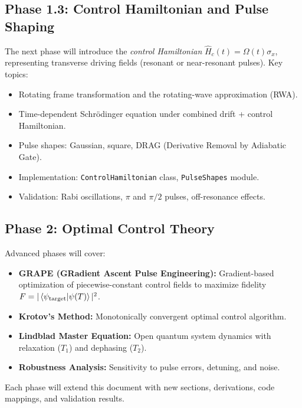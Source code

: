 \documentclass[11pt,a4paper]{article}
\theoremstyle{definition}
\theoremstyle{remark}
\begin{document}
\subsection{Phase 1.3: Control Hamiltonian and Pulse Shaping}

The next phase will introduce the \emph{control Hamiltonian} $\hat{H}_c(t) = \Omega(t) \sigma_x$, representing transverse driving fields (resonant or near-resonant pulses). Key topics:

\begin{itemize}
    \item Rotating frame transformation and the rotating-wave approximation (RWA).
    \item Time-dependent Schrödinger equation under combined drift + control Hamiltonian.
    \item Pulse shapes: Gaussian, square, DRAG (Derivative Removal by Adiabatic Gate).
    \item Implementation: \texttt{ControlHamiltonian} class, \texttt{PulseShapes} module.
    \item Validation: Rabi oscillations, $\pi$ and $\pi/2$ pulses, off-resonance effects.
\end{itemize}

\subsection{Phase 2: Optimal Control Theory}

Advanced phases will cover:

\begin{itemize}
    \item \textbf{GRAPE (GRadient Ascent Pulse Engineering):} Gradient-based optimization of piecewise-constant control fields to maximize fidelity $F = |\braket{\psi_{\text{target}}}{\psi(T)}|^2$.
    \item \textbf{Krotov's Method:} Monotonically convergent optimal control algorithm.
    \item \textbf{Lindblad Master Equation:} Open quantum system dynamics with relaxation ($T_1$) and dephasing ($T_2$).
    \item \textbf{Robustness Analysis:} Sensitivity to pulse errors, detuning, and noise.
\end{itemize}

Each phase will extend this document with new sections, derivations, code mappings, and validation results.

\end{document}
